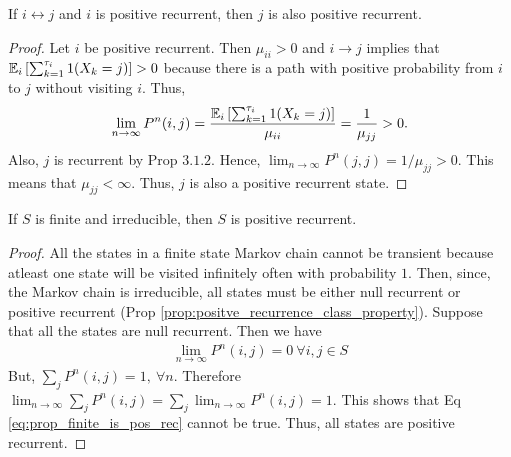 \documentclass[all-lectures.tex]{subfiles}
\begin{document}
\begin{prop} \label{prop:positve_recurrence_class_property}
If $i\leftrightarrow j$ and $i$ is positive recurrent, then $j$ is also positive recurrent. 
\begin{proof}
Let $i$ be positive recurrent. Then $\mu_{ii} > 0$ and $i\rightarrow j$ implies that $\mathbb{E}_i\left[\sum_{k=1}^{\tau_i} 1(X_k=j)\right] > 0$ because there is a path with positive probability from $i$ to $j$ without visiting $i$. Thus, 
\begin{align*}
\lim_{n\rightarrow \infty} P^n(i,j) = \frac{\mathbb{E}_i\left[\sum_{k=1}^{\tau_i} 1(X_k=j)\right]}{\mu_{ii}} = \frac{1}{\mu_{jj}}>0.
\end{align*}
Also, $j$ is recurrent by Prop $3.1.2$. Hence, $\lim_{n\rightarrow \infty} P^n(j,j) = 1/\mu_{jj} > 0$. This means that $\mu_{jj} < \infty$. Thus, $j$ is also a positive recurrent state. 
\end{proof}
\end{prop}
\begin{prop}
If $S$ is finite and irreducible, then $S$ is positive recurrent. 
\begin{proof}
All the states in a finite state Markov chain cannot be transient because atleast one state will be visited infinitely often with probability $1$. Then, since, the Markov chain is irreducible, all states must be either null recurrent or positive recurrent (Prop \ref{prop:positve_recurrence_class_property}). Suppose that all the states are null recurrent. Then we have
\begin{align} \label{eq:prop_finite_is_pos_rec}
\lim_{n\rightarrow \infty} P^n(i,j) = 0 \ \forall i,j \in S
\end{align} 
But, $\sum_j P^n(i,j) = 1,\ \forall n$. Therefore $\lim_{n \rightarrow \infty} \sum_j P^n(i,j) = \sum_j \lim_{n \rightarrow \infty}  P^n(i,j) = 1$. This shows that Eq \ref{eq:prop_finite_is_pos_rec} cannot be true. Thus, all states are positive recurrent.
\end{proof}
\end{prop}
\end{document}
